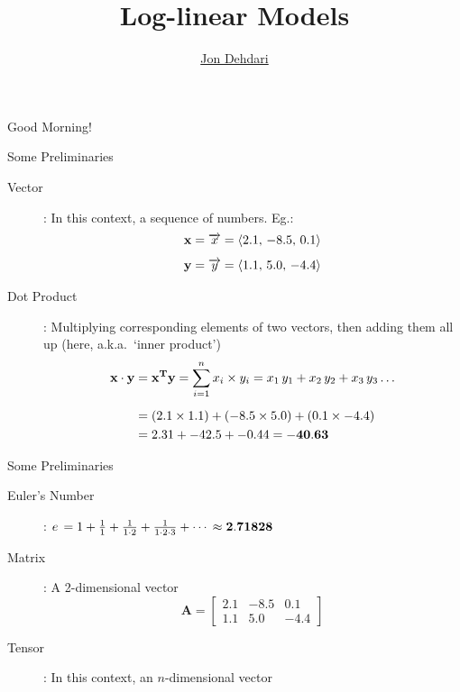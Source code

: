 \documentclass[xcolor=pdftex,x11names,table,hyperref]{beamer}
\begin{document}
\title{Log-linear Models \\[1.5em]
 }
\author{\href{http://jon.dehdari.org}{Jon Dehdari}}
\frame{\titlepage}

\begin{frame}{Good Morning!}
	\begin{center}
	\end{center}
\end{frame}

\begin{frame}{Some Preliminaries}
\begin{description}
	\item[Vector]: In this context, a sequence of numbers. Eg.:
	\begin{align*}
	{\bf x} &= \overrightarrow{x} = \langle 2.1, \, -8.5, \, 0.1 \rangle \\[0.5em]
	{\bf y} &= \overrightarrow{y} = \langle 1.1, \,  5.0, \, -4.4 \rangle
	\end{align*}
	\pause
	\item[Dot Product]: Multiplying corresponding elements of two vectors, then adding them all up (here, a.k.a.\ `inner product')
	\begin{align*}
	{\bf x \cdot y} &= {\bf x^Ty} =  \sum_{i=1}^n x_i \times y_i = x_1 \, y_1 + x_2 \, y_2 + x_3 \, y_3 \ldots \\[0.5em]
					&= (2.1 \times 1.1) + (-8.5 \times 5.0) + (0.1 \times -4.4) \\
					&= 2.31 + -42.5 + -0.44 = {\bf -40.63}
	\end{align*}
\end{description}
\end{frame}

\begin{frame}{Some Preliminaries}
\begin{description}
	\item[Euler's Number]: ${\mathnormal e} \, = 1 + \frac{1}{1} + \frac{1}{1\cdot 2} + \frac{1}{1\cdot 2\cdot 3} + \cdots \, \approx {\bf 2.71828} $
	\pause
	\item[Matrix]: A 2-dimensional vector
	\begin{equation*}
	{\boldsymbol A} =
	\begin{bmatrix}
	2.1 & -8.5 & 0.1 \\
	1.1 & 5.0 & -4.4
	 \end{bmatrix}
	\end{equation*}
	\pause
	\item[Tensor]: In this context, an $n$-dimensional vector
\end{description}
\end{frame}
\end{document}
